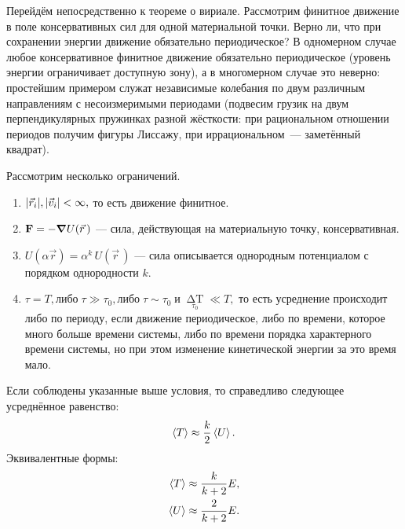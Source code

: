 \documentclass[12pt, a4paper]{article}
\begin{document}
Перейдём непосредственно к теореме о вириале. Рассмотрим финитное движение в поле консервативных сил для одной материальной точки. Верно ли, что при сохранении энергии движение обязательно периодическое? В одномерном случае любое консервативное финитное движение обязательно периодическое (уровень энергии ограничивает доступную зону), а в многомерном случае это неверно: простейшим примером служат независимые колебания по двум  различным направлениям с несоизмеримыми периодами (подвесим грузик на двум перпендикулярных пружинках разной жёсткости: при рациональном отношении периодов получим фигуры Лиссажу, при иррациональном~--- заметённый квадрат).

\begin{thm} Рассмотрим несколько ограничений.
\begin{enumerate}
\item $\abs{\vec{r}_i}, \abs{\vec{v}_i} < \infty,$ то есть движение финитное.
\item $\vb{F} = - \grad U(\vec{r}\,)$ --- сила, действующая на материальную точку, консервативная. \label{potential}
\item $U(\alpha \vec{r}) = \alpha^k\,U(\vec{r}\,) $ --- сила описывается однородным потенциалом с порядком однородности $k$. \label{homogeneity}
\item $\tau = T, \text{либо}\; \tau \gg \tau_0, \text{либо}\; \tau \sim \tau_0\; \text{и}\; \mathop{\Delta T}\limits_{\tau_0} \ll T,$ то есть усреднение происходит либо по периоду, если движение периодическое, либо по времени, которое много больше времени системы, либо по времени порядка характерного времени системы, но при этом изменение кинетической энергии за это время мало.
\end{enumerate}

\noindent Если соблюдены указанные выше условия, то справедливо следующее усреднённое равенство:
\begin{equation}
\expval{T} \approx \frac{k}{2} \expval{U}.
\end{equation}
Эквивалентные формы:
\begin{align}
\expval{T} &\approx \frac{k}{k+2} E,\\
\expval{U} &\approx \frac{2}{k+2} E. 
\end{align}
\end{thm}
\end{document}

